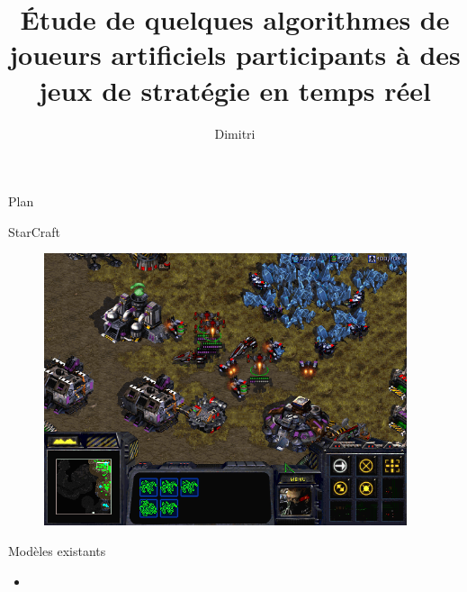 \documentclass[french]{beamer}
\title{Étude de quelques algorithmes de joueurs artificiels participants à des jeux de stratégie en temps réel}
\author{Dimitri \bsc{Cocheril-Crèvecœur}}
\begin{document}
\begin{frame}[plain]
    \maketitle
\end{frame}
\begin{frame}{Plan}
	
\end{frame}
\begin{frame}{StarCraft}
	\begin{figure}
		\centering
		\begin{minipage}{0.49\textwidth}
			\centering
			\includegraphics[width=0.95\textwidth]{screen_starcraft.png}
		\end{minipage}\hfill
		\begin{minipage}{0.49\textwidth}
			
		\end{minipage}
	\end{figure}
\end{frame}
\begin{frame}{Modèles existants}
	\begin{itemize}
		\item 
	\end{itemize}
\end{frame}
\end{document}

